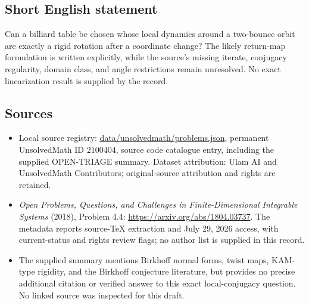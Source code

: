 \documentclass[11pt]{article}
\begin{document}
\subsection{Short English statement}
Can a billiard table be chosen whose local dynamics around a two-bounce orbit are exactly a rigid rotation after a coordinate change? The likely return-map formulation is written explicitly, while the source's missing iterate, conjugacy regularity, domain class, and angle restrictions remain unresolved. No exact linearization result is supplied by the record.
\subsection{Sources}
\begin{itemize}
\item Local source registry: \url{data/unsolvedmath/problems.json}, permanent UnsolvedMath ID $2100404$, source code catalogue entry, including the supplied OPEN-TRIAGE summary. Dataset attribution: Ulam AI and UnsolvedMath Contributors; original-source attribution and rights are retained.
\item \emph{Open Problems, Questions, and Challenges in Finite-Dimensional Integrable Systems} (2018), Problem 4.4: \url{https://arxiv.org/abs/1804.03737}. The metadata reports source-TeX extraction and July 29, 2026 access, with current-status and rights review flags; no author list is supplied in this record.
\item The supplied summary mentions Birkhoff normal forms, twist maps, KAM-type rigidity, and the Birkhoff conjecture literature, but provides no precise additional citation or verified answer to this exact local-conjugacy question. No linked source was inspected for this draft.
\end{itemize}
\end{document}
